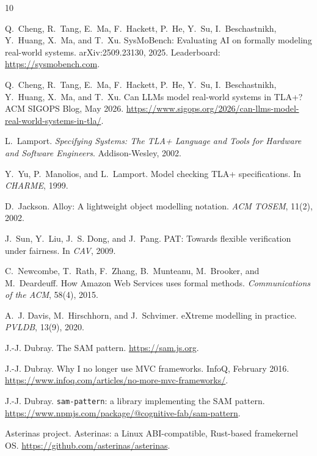\documentclass[11pt]{article}
\begin{document}
\begin{thebibliography}{10}
\small

Q.~Cheng, R.~Tang, E.~Ma, F.~Hackett, P.~He, Y.~Su, I.~Beschastnikh,
Y.~Huang, X.~Ma, and T.~Xu.
\newblock SysMoBench: Evaluating AI on formally modeling real-world systems.
\newblock arXiv:2509.23130, 2025. Leaderboard: \url{https://sysmobench.com}.

Q.~Cheng, R.~Tang, E.~Ma, F.~Hackett, P.~He, Y.~Su, I.~Beschastnikh,
Y.~Huang, X.~Ma, and T.~Xu.
\newblock Can LLMs model real-world systems in TLA+?
\newblock ACM SIGOPS Blog, May 2026.
\newblock \url{https://www.sigops.org/2026/can-llms-model-real-world-systems-in-tla/}.

L.~Lamport.
\newblock \emph{Specifying Systems: The TLA+ Language and Tools for Hardware
  and Software Engineers}.
\newblock Addison-Wesley, 2002.

Y.~Yu, P.~Manolios, and L.~Lamport.
\newblock Model checking TLA+ specifications.
\newblock In \emph{CHARME}, 1999.

D.~Jackson.
\newblock Alloy: A lightweight object modelling notation.
\newblock \emph{ACM TOSEM}, 11(2), 2002.

J.~Sun, Y.~Liu, J.~S. Dong, and J.~Pang.
\newblock PAT: Towards flexible verification under fairness.
\newblock In \emph{CAV}, 2009.

C.~Newcombe, T.~Rath, F.~Zhang, B.~Munteanu, M.~Brooker, and M.~Deardeuff.
\newblock How Amazon Web Services uses formal methods.
\newblock \emph{Communications of the ACM}, 58(4), 2015.

A.~J. Davis, M.~Hirschhorn, and J.~Schvimer.
\newblock eXtreme modelling in practice.
\newblock \emph{PVLDB}, 13(9), 2020.

J.-J. Dubray.
\newblock The SAM pattern.
\newblock \url{https://sam.js.org}.

J.-J. Dubray.
\newblock Why I no longer use MVC frameworks.
\newblock InfoQ, February 2016.
\newblock \url{https://www.infoq.com/articles/no-more-mvc-frameworks/}.

J.-J. Dubray.
\newblock \texttt{sam-pattern}: a library implementing the SAM pattern.
\newblock \url{https://www.npmjs.com/package/@cognitive-fab/sam-pattern}.

Asterinas project.
\newblock Asterinas: a Linux ABI-compatible, Rust-based framekernel OS.
\newblock \url{https://github.com/asterinas/asterinas}.


\end{thebibliography}
\end{document}
